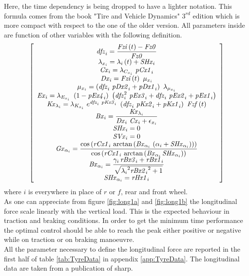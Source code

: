 %
Here, the time dependency is being dropped to have a lighter notation. This formula comes from the book "Tire and Vehicle Dynamics" $3^{rd}$ edition\cite{pacejka2012tire} which is more compact with respect to the one of the older version\cite{pacejka2006tyre}.
All parameters inside are function of other variables with the following definition.
%
\begin{equation}
\left[ \begin{array}{c} 
\displaystyle {\it dfz}_{i} =\frac{{\it Fzi} \left(t 
\right)-{\it Fz0} }{{\it Fz0} }\\ \lambda_{x_{i}} =
\lambda_{i} \left(t \right)+{\it SHx}_{i} \\ {\it Cx
}_{i} =\lambda_{C_{x_{i}}} ~{\it pCx1}_{i} \\ {\it 
Dx}_{i} ={\it Fzi} \left(t \right)~\mu_{x_{i}} \\ 
\mu_{x_{i}} =\left({\it dfz}_{i} ~{\it pDx2}_{i} +{\it pDx1}_{i} 
\right)~\lambda_{\mu_{x_{i}}} \\ {\it Ex}_{i} =
\lambda_{E_{x_{i}}} ~\left(1-{\it pEx4}_{i} \right)~\left({\it dfz}_{i
} ^{2}~{\it pEx3}_{i} +{\it dfz}_{i} ~{\it pEx2}_{i} +{\it pEx1}_{i} 
\right)\\ {\it Kx}_{\lambda_{i}} =\lambda_{K_{x_{i}}
} ~e^{{\it dfz}_{i} ~{\it pKx3}_{i} }~\left({\it dfz}_{i} ~{\it pKx2}_
{i} +{\it pKx1}_{i} \right)~{\it Fzf} \left(t \right)
\\ \displaystyle {\it Bx}_{i} =\frac{{\it Kx}_{\lambda_{i}} }{{
\it Dx}_{i} ~{\it Cx}_{i} +\epsilon_{x_{i}} }\\ {
\it SHx}_{i} =0\\ {\it SVx}_{i} =0\\
\displaystyle {\it Gx}_{\alpha_{i}}={\frac {\cos \left( {\it rCx1}_{i}\,\arctan\left( {\it Bx}_{\alpha_{i}}\, \left( \alpha_{i}+{\it SHx}_{\alpha_{i}} \right)  \right)  \right) }{\cos \left( {\it rCx1}_{i}\,\arctan\left( {\it Bx}_{\alpha_{i}}\,{\it SHx}_{\alpha_{i}} \right) \right) }}\\
\displaystyle {\it Bx}_{\alpha_{i}}={\frac {\gamma_{i}\,{\it rBx3}_{i}+{\it rBx1}_{i}}{\sqrt {{\lambda_{i}}^{2}{{\it rBx2}_{i}}^{2}+1}}}\\
{\it SHx}_{\alpha_{i}}={\it rHx1}_{i}
\end{array}\right] 
\end{equation}
%
where $i$ is everywhere in place of $r$ or $f$, rear and front wheel.\\
As one can appreciate from figure \ref{fig:long1a} and \ref{fig:long1b} the longitudinal force scale linearly with the vertical load. This is the expected behaviour in traction and braking conditions. In order to get the minimum time performance the optimal control should be able to reach the peak either positive or negative while on traction or on braking manoeuvre.\\
All the parameter necessary to define the longitudinal force are reported in the first half of table \ref{tab:TyreData} in appendix \ref{app:TyreData}. The longitudinal data are taken from a publication of sharp.\cite{sharp2014method}
%
